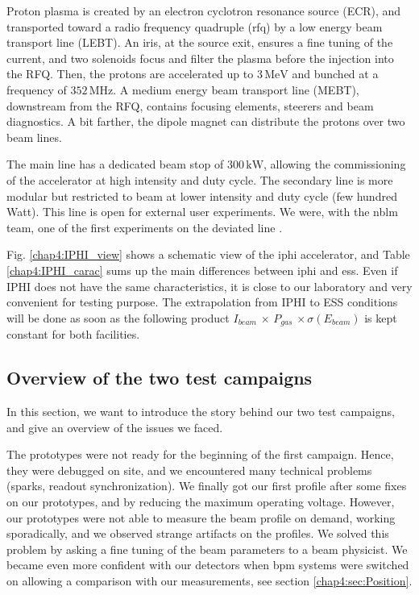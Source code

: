 \begin{refsection}
  
  Proton plasma is created by an electron cyclotron resonance source (ECR), and transported toward a radio frequency quadruple (\acrshort{rfq}) by a low energy beam transport line (LEBT).
  An iris, at the source exit, ensures a fine tuning of the current, and two solenoids focus and filter the plasma before the injection into the RFQ.
  Then, the protons are accelerated up to $3\,\mathrm{MeV}$ and bunched at a frequency of $352\,\mathrm{MHz}$.
  A medium energy beam transport line (MEBT), downstream from the RFQ, contains focusing elements, steerers and beam diagnostics.
  A bit farther, the dipole magnet can distribute the protons over two beam lines.

  The main line has a dedicated beam stop of $300\,\mathrm{kW}$, allowing the commissioning of the accelerator at high intensity and duty cycle.
  The secondary line is more modular but restricted to beam at lower intensity and duty cycle (few hundred Watt).
  This line is open for external user experiments.
  We were, with the \acrshort{nblm} team, one of the first experiments on the deviated line \cite{Senee:IPAC2018-TUPAF016}.

  Fig. \ref{chap4:IPHI_view} shows a schematic view of the \acrshort{iphi} accelerator, and Table \ref{chap4:IPHI_carac} sums up the main differences between \acrshort{iphi} and \acrshort{ess}. Even if IPHI does not have the same characteristics, it is close to our laboratory and very convenient for testing purpose. The extrapolation from IPHI to ESS conditions will be done as soon as the following product $I_{beam}\,\times\,P_{gas}\,\times\sigma(E_{beam})$ is kept constant for both facilities.

  

  \subsection{Overview of the two test campaigns}
  In this section, we want to introduce the story behind our two test campaigns, and give an overview of the issues we faced.

  

  The prototypes were not ready for the beginning of the first campaign.
  Hence, they were debugged on site, and we encountered many technical problems (sparks, readout synchronization).
  We finally got our first profile after some fixes on our prototypes, and by reducing the maximum operating voltage.
  However, our prototypes were not able to measure the beam profile on demand, working sporadically, and we observed strange artifacts on the profiles.
  We solved this problem by asking a fine tuning of the beam parameters to a beam physicist.
  We became even more confident with our detectors when \acrfull{bpm} systems were switched on allowing a comparison with our measurements, see section \ref{chap4:sec:Position}.



\end{refsection}
